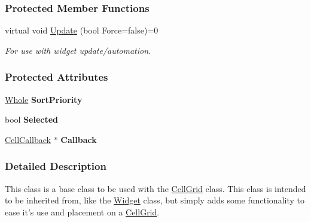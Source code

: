 \subsubsection*{Protected Member Functions}
\begin{DoxyCompactItemize}
\item 
\hypertarget{classphys_1_1UI_1_1Cell_a96227e2648a280f9f7baa0760f8643db}{
virtual void \hyperlink{classphys_1_1UI_1_1Cell_a96227e2648a280f9f7baa0760f8643db}{Update} (bool Force=false)=0}
\label{classphys_1_1UI_1_1Cell_a96227e2648a280f9f7baa0760f8643db}

\begin{DoxyCompactList}\small\item\em For use with widget update/automation. \item\end{DoxyCompactList}\end{DoxyCompactItemize}
\subsubsection*{Protected Attributes}
\begin{DoxyCompactItemize}
\item 
\hypertarget{classphys_1_1UI_1_1Cell_ab5c230b34ef233a3f51b19448ee78b20}{
\hyperlink{namespacephys_a460f6bc24c8dd347b05e0366ae34f34a}{Whole} {\bfseries SortPriority}}
\label{classphys_1_1UI_1_1Cell_ab5c230b34ef233a3f51b19448ee78b20}

\item 
\hypertarget{classphys_1_1UI_1_1Cell_afe3d730ca22d70326aaef627a4707c7d}{
bool {\bfseries Selected}}
\label{classphys_1_1UI_1_1Cell_afe3d730ca22d70326aaef627a4707c7d}

\item 
\hypertarget{classphys_1_1UI_1_1Cell_acb99abbc3dfed845840bc948ba9dda26}{
\hyperlink{classphys_1_1UI_1_1CellCallback}{CellCallback} $\ast$ {\bfseries Callback}}
\label{classphys_1_1UI_1_1Cell_acb99abbc3dfed845840bc948ba9dda26}

\end{DoxyCompactItemize}


\subsubsection{Detailed Description}
This class is a base class to be used with the \hyperlink{classphys_1_1UI_1_1CellGrid}{CellGrid} class. This class is intended to be inherited from, like the \hyperlink{classphys_1_1UI_1_1Widget}{Widget} class, but simply adds some functionality to ease it's use and placement on a \hyperlink{classphys_1_1UI_1_1CellGrid}{CellGrid}. 

